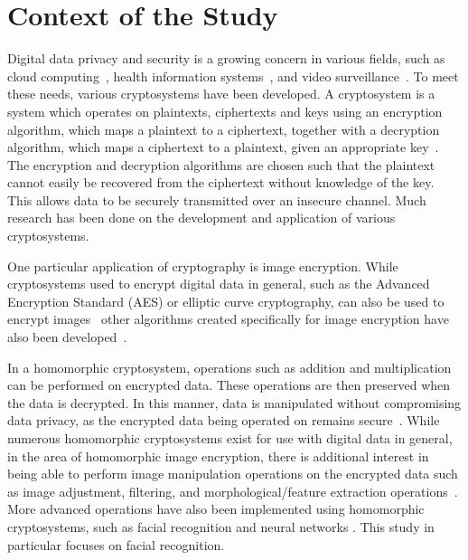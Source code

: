 
\section{Context of the Study}

Digital data privacy and security is a growing concern in various fields, such as cloud computing~\cite{potey_homomorphic_2016}, health information systems~\cite{kester_cryptographic_2015}, and video surveillance~\cite{upmanyu_efficient_2009}. To meet these needs, various cryptosystems have been developed. A cryptosystem is a system which operates on plaintexts, ciphertexts and keys using an encryption algorithm, which maps a plaintext to a ciphertext, together with a decryption algorithm, which maps a ciphertext to a plaintext, given an appropriate key~\cite{bauer_cryptosystem_2005}. The encryption and decryption algorithms are chosen such that the plaintext cannot easily be recovered from the ciphertext without knowledge of the key. This allows data to be securely transmitted over an insecure channel. Much research has been done on the development and application of various cryptosystems.

One particular application of cryptography is image encryption. While cryptosystems used to encrypt digital data in general, such as the Advanced Encryption Standard (AES) or elliptic curve cryptography, can also be used to encrypt images~\cite{jain_image_2016, singh_image_2015} other algorithms created specifically for image encryption have also been developed~\cite{murugan_survey_2018}.

 In a homomorphic cryptosystem, operations such as addition and multiplication can be performed on encrypted data. These operations are then preserved when the data is decrypted. In this manner, data is manipulated without compromising data privacy, as the encrypted data being operated on remains secure~\cite{fontaine_survey_2007, sen_homomorphic_2013}. While numerous homomorphic cryptosystems exist for use with digital data in general, in the area of homomorphic image encryption, there is additional interest in being able to perform image manipulation operations on the encrypted data such as image adjustment, filtering, and morphological/feature extraction operations~\cite{ziad_cryptoimg:_2016, gonzalez_digital_2008}. More advanced operations have also been implemented using homomorphic cryptosystems, such as facial recognition \cite{hutchison_privacy-preserving_2009} and neural networks \cite{hesamifard_cryptodl:_2017}. This study in particular focuses on facial recognition.
